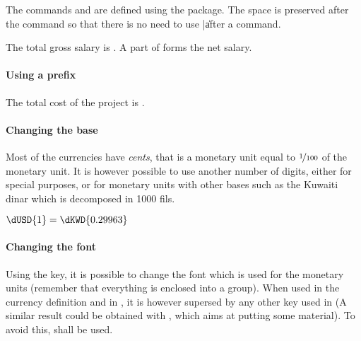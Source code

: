 \documentclass[12pt,add-index]{cnltx-doc}
\begin{document}
The commands  and  are defined using 
the  package. The space is preserved after the command
so that there is no need to use \verbcode|\| after a command.

\begin{example}
    The total gross salary is . A part of  forms the net salary.
\end{example}

\paragraph*{Using a prefix}

\begin{example}
    The total cost of the project is .
\end{example}

\paragraph*{Changing the base}

Most of the currencies have \emph{cents}, that is a monetary unit equal to $\nicefrac{1}{100}$ 
of the monetary unit. It is however possible to use another number of digits, either 
for special purposes, or for monetary units with other bases such as the Kuwaiti dinar
which is decomposed in \num{1000} fils.

\begin{example}
    $\dUSD{1}=\dKWD{0.29963}$
\end{example}

\paragraph*{Changing the font}

Using the  key, it is possible to change the font which 
is used for the monetary units (remember that everything is enclosed into a group). 
When used in the currency definition and in , 
it is however supersed by any other  key used in 
(A similar result could be obtained with , which aims
at putting some material). To avoid this,  shall be used.
\end{document}
